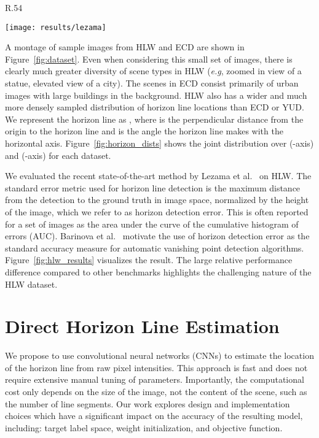 \documentclass{bmvc2k}
\makeatletter
\newcommand{\figref}[1]{Figure~\ref{fig:#1}}
\newcommand*{\eg}{e.g.\@\xspace}
\def\eg{\emph{e.g}\bmvaOneDot}
\makeatother
\begin{document}
\begin{wrapfigure}{R}{.54\linewidth}
  
  \centering
  
  \texttt{[image: results/lezama]}

  \caption{Evaluating the recent state-of-the-art method by
    Lezama et al.~\cite{lezama2014finding} on HLW. The fraction of
    images (-axis) with a horizon error less than a threshold
    (-axis). The AUC is shown in the legend.}
 
  \label{fig:hlw_results}
\end{wrapfigure}

A montage of sample images from HLW and ECD are shown in \figref{dataset}. Even when considering this
small set of images, there is clearly much greater diversity of scene
types in HLW (\eg, zoomed in view of a statue, elevated view of a
city). The scenes in ECD consist primarily of urban images with large
buildings in the background. HLW also has a wider and much more
densely sampled distribution of horizon line locations than ECD or
YUD. We represent the horizon line as , where  is the perpendicular distance from the origin to
the horizon line and  is the angle the horizon line makes with the horizontal
axis. \figref{horizon_dists} shows the joint distribution over
 (-axis) and  (-axis) for each dataset.

We evaluated the recent state-of-the-art method by Lezama et
al.~\cite{lezama2014finding} on HLW. The standard error metric used
for horizon line detection is the maximum distance from the detection
to the ground truth in image space, normalized by the height of the
image, which we refer to as horizon detection error. This is often
reported for a set of images as the area under the curve of the
cumulative histogram of errors (AUC).  Barinova et
al.~\cite{barinova2010geometric} motivate the use of horizon detection
error as the standard accuracy measure for automatic vanishing point
detection algorithms. \figref{hlw_results} visualizes the result. The
large relative performance difference compared to other benchmarks
highlights the challenging nature of the HLW dataset.  


\section{Direct Horizon Line Estimation}
\label{sec:methods}

We propose to use convolutional neural networks (CNNs) to estimate the
location of the horizon line from raw pixel intensities. This approach
is fast and does not require extensive manual tuning of parameters.
Importantly, the computational cost only depends on the size of the
image, not the content of the scene, such as the number of line
segments. Our work explores design and implementation choices which
have a significant impact on the accuracy of the resulting model,
including: target label space, weight initialization, and objective
function.
\end{document}
